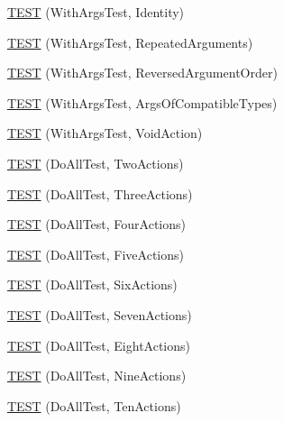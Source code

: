 \begin{DoxyCompactItemize}
\mbox{\hyperlink{namespacetesting_1_1gmock__generated__actions__test_a0499d0970300d8d6c252a898222b8dd3}{T\+E\+ST}} (With\+Args\+Test, Identity)
\item 
\mbox{\hyperlink{namespacetesting_1_1gmock__generated__actions__test_aea7114a30b1fc589d14e84f1a27bd1fb}{T\+E\+ST}} (With\+Args\+Test, Repeated\+Arguments)
\item 
\mbox{\hyperlink{namespacetesting_1_1gmock__generated__actions__test_a8a9dc47b8e9810ca74166a9d17cba54f}{T\+E\+ST}} (With\+Args\+Test, Reversed\+Argument\+Order)
\item 
\mbox{\hyperlink{namespacetesting_1_1gmock__generated__actions__test_a4330224375c915f21860c30798dacd0c}{T\+E\+ST}} (With\+Args\+Test, Args\+Of\+Compatible\+Types)
\item 
\mbox{\hyperlink{namespacetesting_1_1gmock__generated__actions__test_a744fd048a745e3df48a578ed251003c6}{T\+E\+ST}} (With\+Args\+Test, Void\+Action)
\item 
\mbox{\hyperlink{namespacetesting_1_1gmock__generated__actions__test_ab1820fa999561582ae20885c4149a634}{T\+E\+ST}} (Do\+All\+Test, Two\+Actions)
\item 
\mbox{\hyperlink{namespacetesting_1_1gmock__generated__actions__test_a9fe00b82e3daa39501cefb4636b1909c}{T\+E\+ST}} (Do\+All\+Test, Three\+Actions)
\item 
\mbox{\hyperlink{namespacetesting_1_1gmock__generated__actions__test_aa6ed664752eab81abc0c8ec08bc28fe0}{T\+E\+ST}} (Do\+All\+Test, Four\+Actions)
\item 
\mbox{\hyperlink{namespacetesting_1_1gmock__generated__actions__test_adf15fb74ccf2a473a31f0ae733210f3f}{T\+E\+ST}} (Do\+All\+Test, Five\+Actions)
\item 
\mbox{\hyperlink{namespacetesting_1_1gmock__generated__actions__test_af9328f486c8862bfb3a08bd9c0b10a2d}{T\+E\+ST}} (Do\+All\+Test, Six\+Actions)
\item 
\mbox{\hyperlink{namespacetesting_1_1gmock__generated__actions__test_aa1eb8dae72fb173011bf64027f075cea}{T\+E\+ST}} (Do\+All\+Test, Seven\+Actions)
\item 
\mbox{\hyperlink{namespacetesting_1_1gmock__generated__actions__test_a7e7ffc936de010908f42193b951016e3}{T\+E\+ST}} (Do\+All\+Test, Eight\+Actions)
\item 
\mbox{\hyperlink{namespacetesting_1_1gmock__generated__actions__test_ae2037cf34f7bbdb2aa779f31f44c0530}{T\+E\+ST}} (Do\+All\+Test, Nine\+Actions)
\item 
\mbox{\hyperlink{namespacetesting_1_1gmock__generated__actions__test_a11cc35bfa98278915c040aac2329b4a7}{T\+E\+ST}} (Do\+All\+Test, Ten\+Actions)

\end{DoxyCompactItemize}
